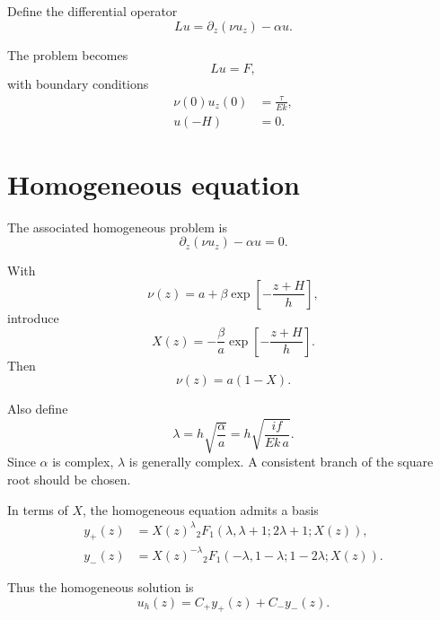 \documentclass[10pt]{amsart}
\begin{document}
Define the differential operator
\begin{equation}
L u
=
\partial_z(\nu u_z)-\alpha u.
\label{eq:operator}
\end{equation}

The problem becomes
\begin{equation}
L u = F,
\label{eq:LuF}
\end{equation}
with boundary conditions
\begin{align}
\nu(0)u_z(0) &= \frac{\tau}{E k}, \label{eq:bc_surface_reduced}\\
u(-H)&=0. \label{eq:bc_bottom_reduced}
\end{align}

\section{Homogeneous equation}

The associated homogeneous problem is
\begin{equation}
\partial_z(\nu u_z)-\alpha u=0.
\label{eq:hom}
\end{equation}

With
\[
\nu(z)=a+\beta \exp\!\left[-\frac{z+H}{h}\right],
\]
introduce
\begin{equation}
X(z)
=
-\frac{\beta}{a}
\exp\!\left[-\frac{z+H}{h}\right].
\label{eq:X_def}
\end{equation}
Then
\begin{equation}
\nu(z)=a(1-X).
\end{equation}

Also define
\begin{equation}
\lambda
=
h\sqrt{\frac{\alpha}{a}}
=
h\sqrt{\frac{i f}{E k\,a}}.
\label{eq:lambda_def}
\end{equation}
Since \(\alpha\) is complex, \(\lambda\) is generally complex. A consistent branch of the square root should be chosen.

In terms of \(X\), the homogeneous equation admits a basis
\begin{align}
y_+(z)
&=
X(z)^\lambda
{}_2F_1
\left(
\lambda,\lambda+1;2\lambda+1;X(z)
\right),
\label{eq:yplus}
\\[0.5em]
y_-(z)
&=
X(z)^{-\lambda}
{}_2F_1
\left(
-\lambda,1-\lambda;1-2\lambda;X(z)
\right).
\label{eq:yminus}
\end{align}

Thus the homogeneous solution is
\begin{equation}
u_h(z)
=
C_+ y_+(z)+C_- y_-(z).
\label{eq:uh}
\end{equation}
\end{document}
